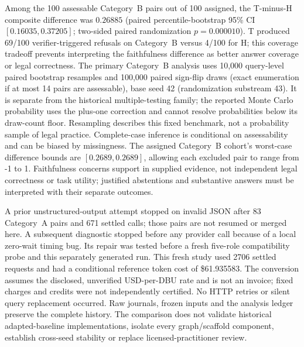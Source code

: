 Among the 100 assessable Category~B pairs out of 100 assigned, the T-minus-H composite difference was $0.26885$ (paired percentile-bootstrap 95\% CI $[0.16035, 0.37205]$; two-sided paired randomization $p=0.000010$). T produced 69/100 verifier-triggered refusals on Category~B versus 4/100 for H; this coverage tradeoff prevents interpreting the faithfulness difference as better answer coverage or legal correctness. The primary Category~B analysis uses 10,000 query-level paired bootstrap resamples and 100,000 paired sign-flip draws (exact enumeration if at most 14 pairs are assessable), base seed 42 (randomization substream 43). It is separate from the historical multiple-testing family; the reported Monte Carlo probability uses the plus-one correction and cannot resolve probabilities below its draw-count floor. Resampling describes this fixed benchmark, not a probability sample of legal practice. Complete-case inference is conditional on assessability and can be biased by missingness. The assigned Category~B cohort's worst-case difference bounds are $[0.2689, 0.2689]$, allowing each excluded pair to range from -1 to 1. Faithfulness concerns support in supplied evidence, not independent legal correctness or task utility; justified abstentions and substantive answers must be interpreted with their separate outcomes.

A prior unstructured-output attempt stopped on invalid JSON after 83 Category~A pairs and 671 settled calls; those pairs are not resumed or merged here. A subsequent diagnostic stopped before any provider call because of a local zero-wait timing bug. Its repair was tested before a fresh five-role compatibility probe and this separately generated run. This fresh study used 2706 settled requests and had a conditional reference token cost of \$61.935583. The conversion assumes the disclosed, unverified USD-per-DBU rate and is not an invoice; fixed charges and credits were not independently certified. No HTTP retries or silent query replacement occurred. Raw journals, frozen inputs and the analysis ledger preserve the complete history. The comparison does not validate historical adapted-baseline implementations, isolate every graph/scaffold component, establish cross-seed stability or replace licensed-practitioner review.
